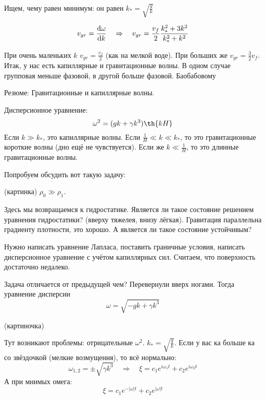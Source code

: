Ищем, чему равен минимум: он равен $k_{*} = \sqrt{\frac{g}{k}}$

\begin{equation}
    v_{gr} = \dv{\omega}{k} \quad \Rightarrow \quad 
    v_{gr} = \frac{v_f}{2}\frac{k_{*}^2+3k^2}{k_{*}^2+k^2}
\end{equation}

При очень маленьких $k$ $v_{gr} = \frac{v_f}{2}$ (как на мелкой воде). 
При больших же $v_{gr} = \frac{3}{2}v_f$.
Итак, у нас есть капиллярные и гравитационные волны.
В одном случае групповая меньше фазовой, в другой больше фазовой. Баобабовому

Резюме:
Гравитационные и капиллярные волны.

Дисперсионное уравнение:
\begin{equation}
    \omega^2 = (gk+\gamma k^3)\th{kH}
\end{equation}
Если $k \gg k_*$, это капиллярные волны. 
Если $\frac{1}{H} \ll k \ll k_*$, то это гравитационные короткие волны (дно ещё не чувствуется).
Если же $k \ll \frac{1}{H}$, то это длинные гравитационные волны.

Попробуем обсудить вот такую задачу:

(картинка) $\rho_0 \gg \rho_1$.

Здесь мы возвращаемся к гидростатике.
Является ли такое состояние решением уравнения гидростатики? (вверху тяжелея, внизу лёгкая).
Гравитация параллельна градиенту плотности, это хорошо. 
А является ли такое состояние устойчивым? 

Нужно написать уравнение Лапласа, поставить граничные условия, написать дисперсионное уравнение с учётом капиллярных сил. 
Считаем, что поверхность достаточно недалеко.

Задача отличается от предыдущей чем?
Перевернули вверх ногами.
Тогда уравнение дисперсии
\begin{equation}
    \omega = \sqrt{-gk+\gamma k^3}
\end{equation}

(картиночка)

Тут возникают проблемы: отрицательные $\omega^2$. $k_* = \sqrt{\frac{g}{k}}$. Если у вас ка больше ка со звёздочкой (мелкие возмущения), то всё нормально:
\begin{equation}
    \omega_{1,2} = \pm\sqrt{\gamma k^3}
    \quad \Rightarrow \quad
    \xi = c_1e^{i\omega_1 t}+c_2e^{i\omega_2 t}
\end{equation}
А при мнимых омега:
\begin{equation}
    \xi = c_1e^{-|\omega|t}+c_2e^{|\omega|t}
\end{equation}

